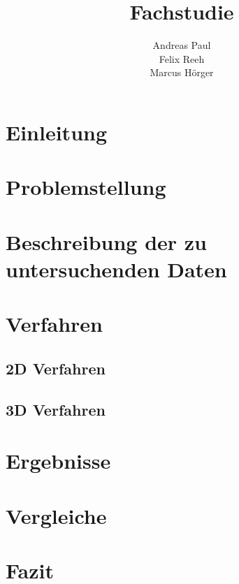 \documentclass[a4paper]{scrreprt}
\author{
Andreas Paul\\
Felix Reeh\\
Marcus Hörger}
\title{Fachstudie}
\newcommand{\SetPageLayout}{
	\pagestyle{fancyplain}
	\fancyhf{} %
	\fancyhead[L]{\fancyplain{\gettitle}{\gettitle}} %
	\fancyhead[C]{} %
	\fancyhead[R]{\fancyplain{\nouppercase \leftmark}{\nouppercase \leftmark}} %
	\fancyfoot[C]{\fancyplain{\thepage}{\thepage}}
	\renewcommand{\footrulewidth}{0pt}
}
\begin{document}
	
	\maketitle
	\SetPageLayout
	\tableofcontents
	\setlength{\parindent}{0pt}
	\setlength{\parskip}{1ex plus 0.5ex minus 0.2ex}
	\newpage



\chapter{Einleitung}

\chapter{Problemstellung}

\chapter{Beschreibung der zu untersuchenden Daten}

\chapter{Verfahren}

\section{2D Verfahren}

\section{3D Verfahren}

\chapter{Ergebnisse}

\chapter{Vergleiche}

\chapter{Fazit}


\end{document}
